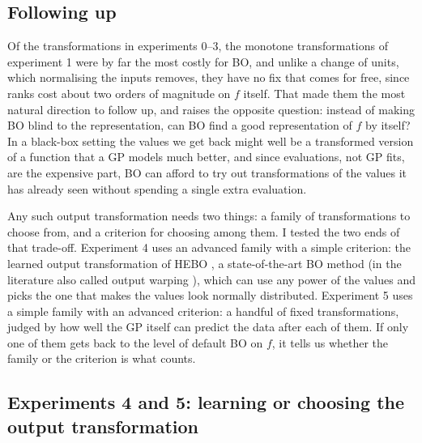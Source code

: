 \documentclass[12pt,a4paper]{article}
\begin{document}
\subsection{Following up}

Of the transformations in experiments 0--3, the monotone transformations of experiment 1 were by far the most costly for BO, and unlike a change of units, which normalising the inputs removes, they have no fix that comes for free, since ranks cost about two orders of magnitude on \(f\) itself. That made them the most natural direction to follow up, and raises the opposite question: instead of making BO blind to the representation, can BO find a good representation of \(f\) by itself? In a black-box setting the values we get back might well be a transformed version of a function that a GP models much better, and since evaluations, not GP fits, are the expensive part, BO can afford to try out transformations of the values it has already seen without spending a single extra evaluation.

Any such output transformation needs two things: a family of transformations to choose from, and a criterion for choosing among them. I tested the two ends of that trade-off. Experiment 4 uses an advanced family with a simple criterion: the learned output transformation of HEBO \cite{hebo2022}, a state-of-the-art BO method (in the literature also called output warping \cite{snelson2004}), which can use any power of the values and picks the one that makes the values look normally distributed. Experiment 5 uses a simple family with an advanced criterion: a handful of fixed transformations, judged by how well the GP itself can predict the data after each of them. If only one of them gets back to the level of default BO on \(f\), it tells us whether the family or the criterion is what counts.

\subsection{Experiments 4 and 5: learning or choosing the output transformation}
\end{document}
